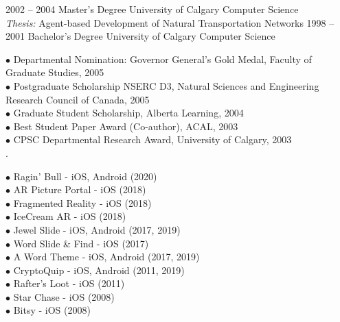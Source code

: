 \documentclass[9pt]{developercv}
\begin{document}

\begin{entrylist}
	\entry
		{2002 -- 2004}
		{Master's Degree}
		{University of Calgary}
		{Computer Science\\\footnotesize{{\sl Thesis:} Agent-based Development of Natural Transportation Networks}}
	\entry
		{1998 -- 2001}
		{Bachelor's Degree}
		{University of Calgary}
		{Computer Science}
\end{entrylist}


$\bullet$ Departmental Nomination: Governor General's Gold Medal, Faculty of Graduate Studies, 2005\\
$\bullet$ Postgraduate Scholarship NSERC D3, Natural Sciences and Engineering Research Council of Canada, 2005\\
$\bullet$ Graduate Student Scholarship, Alberta Learning, 2004\\
$\bullet$ Best Student Paper Award (Co-author), ACAL, 2003\\
$\bullet$ CPSC Departmental Research Award, University of Calgary, 2003\\


.


$\bullet$ Ragin' Bull - iOS, Android (2020)\\
$\bullet$ AR Picture Portal - iOS (2018)\\
$\bullet$ Fragmented Reality - iOS (2018)\\
$\bullet$ IceCream AR - iOS (2018)\\
$\bullet$ Jewel Slide - iOS, Android (2017, 2019)\\
$\bullet$ Word Slide \& Find - iOS (2017)\\
$\bullet$ A Word Theme - iOS, Android (2017, 2019)\\
$\bullet$ CryptoQuip - iOS, Android (2011, 2019)\\
$\bullet$ Rafter’s Loot - iOS (2011)\\
$\bullet$ Star Chase - iOS (2008)\\
$\bullet$ Bitsy - iOS (2008)\\
\end{document}
